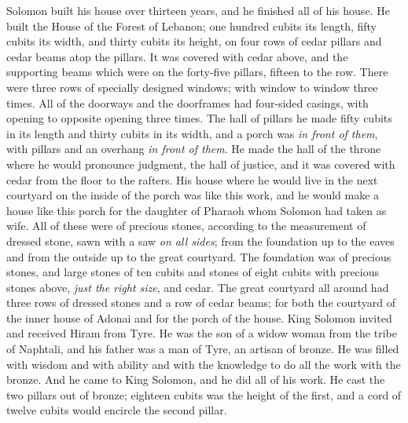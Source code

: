 \begin{biblechapter} %
 Solomon built his house over thirteen years, and he finished all of his house.
\verse He built the House of the Forest of Lebanon; one hundred cubits its length, fifty cubits its width, and thirty cubits its height, on four rows of cedar pillars and cedar beams atop the pillars.
\verse It was covered with cedar above, and the supporting beams which were on the forty-five pillars, fifteen to the row.
\verse There were three rows of specially designed windows; with window to window three times.
\verse All of the doorways and the doorframes had four-sided casings, with opening to opposite opening three times.
\verse The hall of pillars he made fifty cubits in its length and thirty cubits in its width, and a porch was \textit{in front of them}, with pillars and an overhang \textit{in front of them}.
\verse He made the hall of the throne where he would pronounce judgment, the hall of justice, and it was covered with cedar from the floor to the rafters.
\verse His house where he would live in the next courtyard on the inside of the porch was like this work, and he would make a house like this porch for the daughter of Pharaoh whom Solomon had taken as wife.
\verse All of these were of precious stones, according to the measurement of dressed stone, sawn with a saw \textit{on all sides}; from the foundation up to the eaves and from the outside up to the great courtyard.
\verse The foundation was of precious stones, and large stones of ten cubits and stones of eight cubits
\verse with precious stones above, \textit{just the right size}, and cedar.
\verse The great courtyard all around had three rows of dressed stones and a row of cedar beams; for both the courtyard of the inner house of Adonai and for the porch of the house.
\verse King Solomon invited and received Hiram from Tyre.
\verse He was the son of a widow woman from the tribe of Naphtali, and his father was a man of Tyre, an artisan of bronze. He was filled with wisdom and with ability and with the knowledge to do all the work with the bronze. And he came to King Solomon, and he did all of his work.
\verse He cast the two pillars out of bronze; eighteen cubits was the height of the first, and a cord of twelve cubits would encircle the second pillar.

\end{biblechapter}
